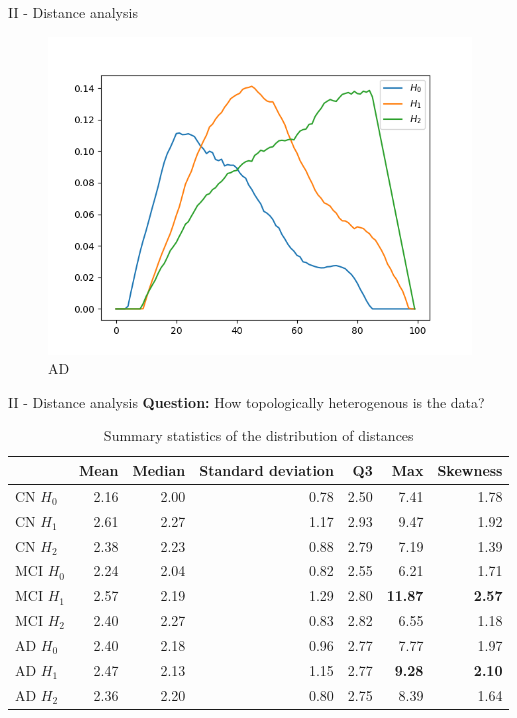 \documentclass[aspectratio=169, 10pt, dvipsnames]{beamer}
\begin{document}
\begin{frame}[fragile]{II - Distance analysis}
  \begin{figure}
    \centering
    \includegraphics[width=\textwidth]{figures/median_pls/median_pl_AD.png}
    \caption{AD}
  \end{figure}
  \endminipage
\end{frame}

\begin{frame}[fragile]{II - Distance analysis}
\textbf{Question:} How topologically heterogenous is the data?
\begin{table}
\centering
\begin{tabular}{lrrrrrr}
\toprule
{} &  Mean &  Median &  Standard deviation &   Q3 &   Max &  Skewness \\
\midrule
CN $H_0$ & 2.16 & 2.00 & 0.78 & 2.50 & 7.41 & 1.78 \\
CN $H_1$ & 2.61 & 2.27 & 1.17 & 2.93 & 9.47 & 1.92 \\
CN $H_2$ & 2.38 & 2.23 & 0.88 & 2.79 & 7.19 & 1.39 \\
MCI $H_0$ & 2.24 & 2.04 & 0.82 & 2.55 & 6.21 & 1.71 \\
MCI $H_1$ & 2.57 & 2.19 & 1.29 & 2.80 & \textbf{11.87} & \textbf{2.57} \\
MCI $H_2$ & 2.40 & 2.27 & 0.83 & 2.82 & 6.55 & 1.18 \\
AD $H_0$ & 2.40 & 2.18 & 0.96 & 2.77 & 7.77 & 1.97 \\
AD $H_1$ & 2.47 & 2.13 & 1.15 & 2.77 & \textbf{9.28} & \textbf{2.10} \\
AD $H_2$ & 2.36 & 2.20 & 0.80 & 2.75 & 8.39 & 1.64 \\
  \bottomrule
\end{tabular}
\caption{Summary statistics of the distribution of distances }
\label{tab:stats_median_pl}
\end{table}
\end{frame}
\end{document}
